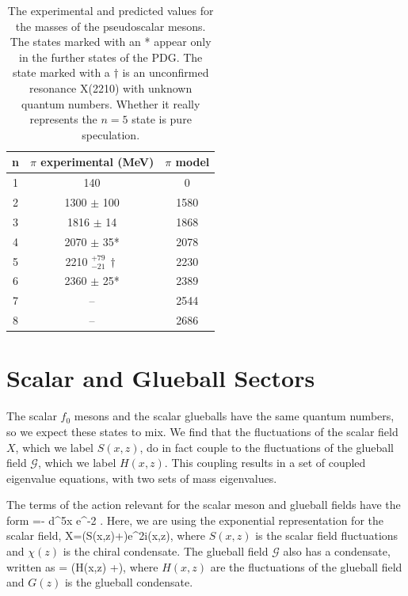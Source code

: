 \begin{table}[htb]
\center
\begin{tabular}{| c || c | c  |}
\hline
n & $\pi$ experimental (MeV) & $\pi$ model \\
\hline
1 & 140 &				0 \\
2 & 1300 $\pm$ 100 & 	1580 \\
3 & 1816 $\pm$ 14&		1868 \\
4 & 2070 $\pm$ 35* & 	2078 \\ 
5 & 2210 $^{+79}_{-21} \, \dagger $ &	2230	\\
6 & 2360 $\pm$ 25* & 				2389 \\
7 & -- & 				2544 \\
8 & -- &				2686 \\
\hline
\end{tabular}
\caption{The experimental \cite{PDG} and predicted values for the masses of the pseudoscalar mesons.  
The states marked with an * appear only in the further states of the PDG.  
The state marked with a $\dagger$ is an unconfirmed resonance X(2210) with unknown quantum numbers.  Whether it really represents the $n=5$ state is pure speculation.}
\label{tabPion}
\end{table}

\section{Scalar and Glueball Sectors}
\label{ch:scalar}

The scalar $f_0$ mesons and the scalar glueballs have the same quantum numbers, so we expect these states to mix.
We find that the fluctuations of the scalar field $X$, which we label $S(x,z)$, do in fact couple to the fluctuations of the glueball field $\mathcal{G}$, which we label $H(x,z)$.
This coupling results in a set of coupled eigenvalue equations, with two sets of mass eigenvalues.

The terms of the action relevant for the scalar meson and glueball fields have the form 
\be
\cS =- \int d^5x  e^{-2\Phi}   .
\ee
Here, we are using the exponential representation for the scalar field,
\be
X=\left(S(x,z)+\right)e^{2i\pi(x,z)},
\ee
where $S(x,z)$ is the scalar field fluctuations and $\chi(z)$ is the chiral condensate.
The glueball field $\mathcal{G}$ also has a condensate, written as
\be
{} = \left(H(x,z) +\right),
\ee
where $H(x,z)$ are the fluctuations of the glueball field and $G(z)$ is the glueball condensate.

